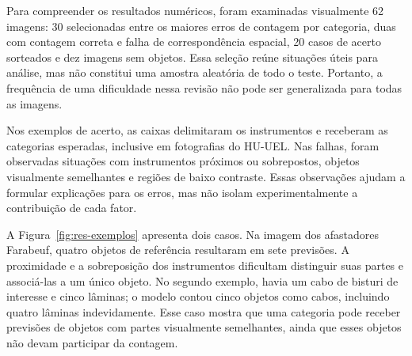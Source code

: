 Para compreender os resultados numéricos, foram examinadas visualmente 62 imagens: 30 selecionadas entre os maiores erros de contagem por categoria, duas com contagem correta e falha de correspondência espacial, 20 casos de acerto sorteados e dez imagens sem objetos. Essa seleção reúne situações úteis para análise, mas não constitui uma amostra aleatória de todo o teste. Portanto, a frequência de uma dificuldade nessa revisão não pode ser generalizada para todas as imagens.

Nos exemplos de acerto, as caixas delimitaram os instrumentos e receberam as categorias esperadas, inclusive em fotografias do HU-UEL. Nas falhas, foram observadas situações com instrumentos próximos ou sobrepostos, objetos visualmente semelhantes e regiões de baixo contraste. Essas observações ajudam a formular explicações para os erros, mas não isolam experimentalmente a contribuição de cada fator.

A Figura~\ref{fig:res-exemplos} apresenta dois casos. Na imagem dos afastadores Farabeuf, quatro objetos de referência resultaram em sete previsões. A proximidade e a sobreposição dos instrumentos dificultam distinguir suas partes e associá-las a um único objeto. No segundo exemplo, havia um cabo de bisturi de interesse e cinco lâminas; o modelo contou cinco objetos como cabos, incluindo quatro lâminas indevidamente. Esse caso mostra que uma categoria pode receber previsões de objetos com partes visualmente semelhantes, ainda que esses objetos não devam participar da contagem.

